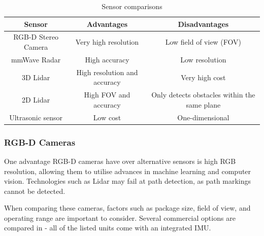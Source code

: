 \documentclass[12pt]{article}
\begin{document}
\begin{table}[H]
    \centering
\begin{adjustbox}{width=\textwidth}
    \begin{tabular}{c c c}
    \toprule
    Sensor & Advantages & Disadvantages \\
    \midrule
    RGB-D Stereo Camera & Very high resolution & Low field of view (FOV) \\
    mmWave Radar & High accuracy & Low resolution \\
    3D Lidar & High resolution and accuracy & Very high cost \\
    2D Lidar & High FOV and accuracy & Only detects obstacles within the same plane \\
    Ultrasonic sensor & Low cost & One-dimensional \\
    \bottomrule
    \end{tabular}
\end{adjustbox}
    \caption{Sensor comparisons}
    \label{table:sensor_options}
\end{table}


\subsubsection{RGB-D Cameras}
One advantage RGB-D cameras have over alternative sensors is high RGB resolution,
allowing them to utilise advances in machine learning and computer vision.
Technologies such as Lidar may fail at path detection, as path markings
cannot be detected.

When comparing these cameras, factors such as package size,
field of view, and operating range are important to consider.
Several commercial options are compared in 
- all of the listed units come with an integrated IMU.
\end{document}
